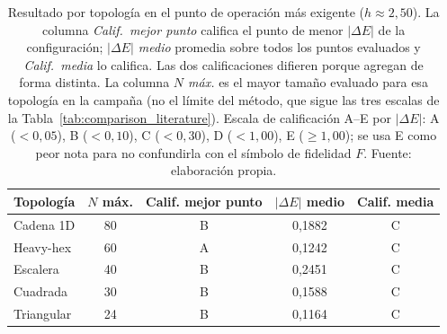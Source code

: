 \begin{table}[htbp]
\centering
\caption[Resultado por topología]{Resultado por topología en el punto de operación más exigente ($h \approx 2,50$). La columna \emph{Calif.\ mejor punto} califica el punto de menor $|\Delta E|$ de la configuración; \emph{$|\Delta E|$ medio} promedia sobre todos los puntos evaluados y \emph{Calif.\ media} lo califica. Las dos calificaciones difieren porque agregan de forma distinta. La columna \emph{$N$ máx.} es el mayor tamaño evaluado para esa topología en la campaña (no el límite del método, que sigue las tres escalas de la Tabla~\ref{tab:comparison_literature}). Escala de calificación A--E por $|\Delta E|$: A ($<0{,}05$), B ($<0{,}10$), C ($<0{,}30$), D ($<1{,}00$), E ($\geq 1{,}00$); se usa E como peor nota para no confundirla con el símbolo de fidelidad $F$. Fuente: elaboración propia.}
\label{tab:auto_scoreboard}
\begin{tabular}{lcccc}
\toprule
Topología & $N$ máx. & Calif. mejor punto & $|\Delta E|$ medio & Calif. media \\
\midrule
Cadena 1D & 80 & B & 0,1882 & C \\
Heavy-hex & 60 & A & 0,1242 & C \\
Escalera & 40 & B & 0,2451 & C \\
Cuadrada & 30 & B & 0,1588 & C \\
Triangular & 24 & B & 0,1164 & C \\
\bottomrule
\end{tabular}
\end{table}
